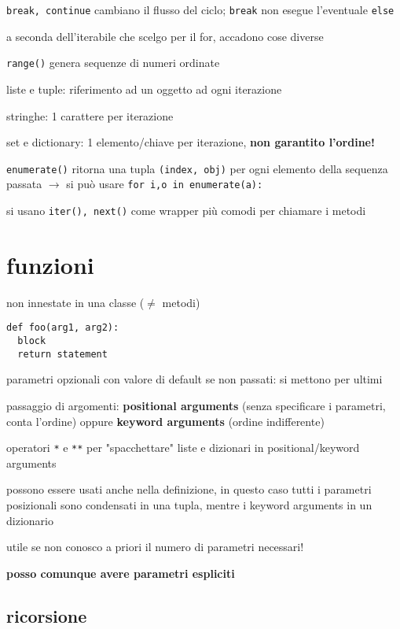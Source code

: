 \texttt{break, continue} cambiano il flusso del ciclo; \texttt{break} non esegue l'eventuale \texttt{else}

a seconda dell'iterabile che scelgo per il for, accadono cose diverse

\texttt{range()} genera sequenze di numeri ordinate

liste e tuple: riferimento ad un oggetto ad ogni iterazione

stringhe: 1 carattere per iterazione

set e dictionary: 1 elemento/chiave per iterazione, \textbf{non garantito l'ordine!}

\texttt{enumerate()} ritorna una tupla \texttt{(index, obj)} per ogni elemento della sequenza passata $\rightarrow$ si pu\`o usare \texttt{for i,o in enumerate(a):}

si usano \texttt{iter(), next()} come wrapper pi\`u comodi per chiamare i metodi

\section{funzioni}

non innestate in una classe ($\neq$ metodi)

\begin{verbatim}
def foo(arg1, arg2):
  block
  return statement
\end{verbatim}

parametri opzionali con valore di default se non passati: si mettono per ultimi

passaggio di argomenti: \textbf{positional arguments} (senza specificare i parametri, conta l'ordine) oppure \textbf{keyword arguments} (ordine indifferente)

operatori \texttt{*} e \texttt{**} per "spacchettare" liste e dizionari in positional/keyword arguments

possono essere usati anche nella definizione, in questo caso tutti i parametri posizionali sono condensati in una tupla, mentre i keyword arguments in un dizionario

utile se non conosco a priori il numero di parametri necessari!

\textbf{posso comunque avere parametri espliciti}

\subsection{ricorsione}

